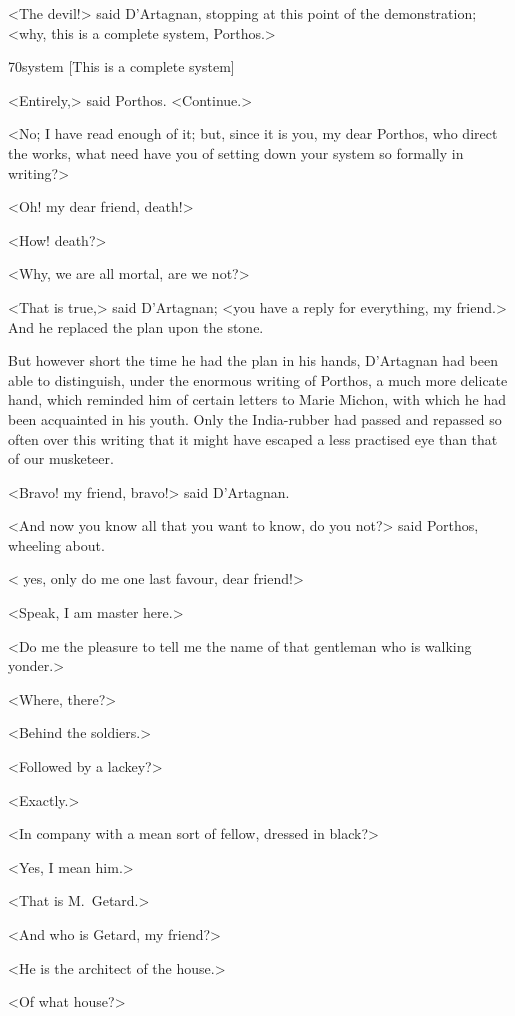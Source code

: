 <The devil!> said D'Artagnan, stopping at this point of the demonstration; <why, this is a complete system, Porthos.>

\begin{bwbigpic}
	[\basicscale] 
	{70system}
	[This is a complete system]
\end{bwbigpic}

<Entirely,> said Porthos. <Continue.>

<No; I have read enough of it; but, since it is you, my dear Porthos, who direct the works, what need have you of setting down your system so formally in writing?>

<Oh! my dear friend, death!>

<How! death?>

<Why, we are all mortal, are we not?>

<That is true,> said D'Artagnan; <you have a reply for everything, my friend.> And he replaced the plan upon the stone.

But however short the time he had the plan in his hands, D'Artagnan had been able to distinguish, under the enormous writing of Porthos, a much more delicate hand, which reminded him of certain letters to Marie Michon, with which he had been acquainted in his youth. Only the India-rubber had passed and repassed so often over this writing that it might have escaped a less practised eye than that of our musketeer.

<Bravo! my friend, bravo!> said D'Artagnan.

<And now you know all that you want to know, do you not?> said Porthos, wheeling about.

< yes, only do me one last favour, dear friend!>

<Speak, I am master here.>

<Do me the pleasure to tell me the name of that gentleman who is walking yonder.>

<Where, there?>

<Behind the soldiers.>

<Followed by a lackey?>

<Exactly.>

<In company with a mean sort of fellow, dressed in black?>

<Yes, I mean him.>

<That is M.~Getard.>

<And who is Getard, my friend?>

<He is the architect of the house.>

<Of what house?>

